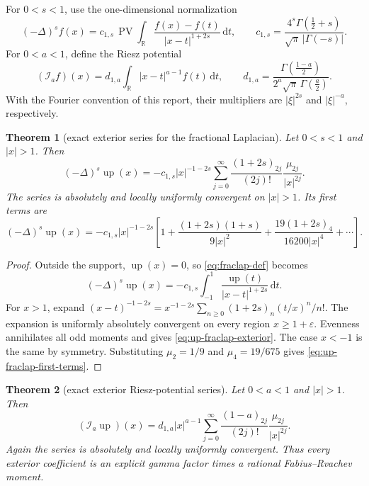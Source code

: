 \documentclass[11pt,oneside]{article}
\newtheorem{theorem}{Theorem}[section]
\theoremstyle{definition}
\newcommand{\upf}{\operatorname{up}}
\newcommand{\R}{\mathbb R}
\newcommand{\dd}{\,\mathrm d}
\begin{document}
For \(0<s<1\), use the one-dimensional normalization
\begin{equation}\label{eq:fraclap-def}
 (-\Delta)^s f(x)
 =c_{1,s}\,\operatorname{PV}\!\int_{\R}
   \frac{f(x)-f(t)}{|x-t|^{1+2s}}\dd t,
 \qquad
 c_{1,s}=\frac{4^s\Gamma(\frac12+s)}{\sqrt\pi\,|\Gamma(-s)|}.
\end{equation}
For \(0<a<1\), define the Riesz potential
\begin{equation}\label{eq:Riesz-def}
 (\mathcal I_a f)(x)
 =d_{1,a}\int_{\R}|x-t|^{a-1}f(t)\dd t,
 \qquad
 d_{1,a}=\frac{\Gamma(\frac{1-a}{2})}
 {2^a\sqrt\pi\,\Gamma(\frac a2)}.
\end{equation}
With the Fourier convention of this report, their multipliers are \(|\xi|^{2s}\)
and \(|\xi|^{-a}\), respectively.

\begin{theorem}[exact exterior series for the fractional Laplacian]
\label{thm:up-fraclap-exterior}
Let \(0<s<1\) and \(|x|>1\).  Then
\begin{equation}\label{eq:up-fraclap-exterior}
 \boxed{
 (-\Delta)^s\upf(x)
 =-c_{1,s}|x|^{-1-2s}
  \sum_{j=0}^{\infty}
   \frac{(1+2s)_{2j}}{(2j)!}
   \frac{\mu_{2j}}{|x|^{2j}}.}
\end{equation}
The series is absolutely and locally uniformly convergent on \(|x|>1\).  Its first
terms are
\begin{equation}\label{eq:up-fraclap-first-terms}
 (-\Delta)^s\upf(x)
 =-c_{1,s}|x|^{-1-2s}
 \left[
  1+\frac{(1+2s)(1+s)}{9|x|^2}
  +\frac{19(1+2s)_4}{16200|x|^4}
  +\cdots
 \right].
\end{equation}
\end{theorem}

\begin{proof}
Outside the support, \(\upf(x)=0\), so \eqref{eq:fraclap-def} becomes
\begin{equation}\label{eq:fraclap-outside-integral}
 (-\Delta)^s\upf(x)
 =-c_{1,s}\int_{-1}^1\frac{\upf(t)}{|x-t|^{1+2s}}\dd t.
\end{equation}
For \(x>1\), expand
\(
 (x-t)^{-1-2s}
 =x^{-1-2s}\sum_{n\ge0}(1+2s)_n(t/x)^n/n!
\).
The expansion is uniformly absolutely convergent on every region \(x\ge1+\varepsilon\).
Evenness annihilates all odd moments and gives \eqref{eq:up-fraclap-exterior}.  The
case \(x<-1\) is the same by symmetry.  Substituting
\(\mu_2=1/9\) and \(\mu_4=19/675\) gives
\eqref{eq:up-fraclap-first-terms}.
\end{proof}

\begin{theorem}[exact exterior Riesz-potential series]
\label{thm:up-Riesz-exterior}
Let \(0<a<1\) and \(|x|>1\).  Then
\begin{equation}\label{eq:up-Riesz-exterior}
 \boxed{
 (\mathcal I_a\upf)(x)
 =d_{1,a}|x|^{a-1}
  \sum_{j=0}^{\infty}
   \frac{(1-a)_{2j}}{(2j)!}
   \frac{\mu_{2j}}{|x|^{2j}}.}
\end{equation}
Again the series is absolutely and locally uniformly convergent.  Thus every exterior
coefficient is an explicit gamma factor times a rational Fabius--Rvachev moment.
\end{theorem}
\end{document}
